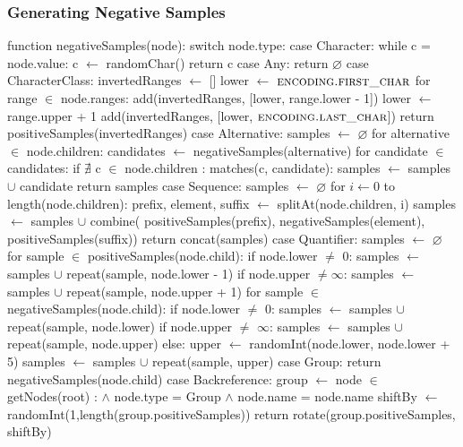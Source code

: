\subsubsection{Generating Negative Samples}

\begin{pseudoCode}[title={Generating Negative Test Samples},breakable=true,label=code:verificationNegative]
function negativeSamples(node):
  switch node.type:
    case Character: %
      while c = node.value:
        c $\gets$ randomChar()
      return c
    case Any:
      return $\varnothing$ %
    case CharacterClass: %
      invertedRanges $\gets$ []
      lower $\gets$ $\textsc{encoding.first\_char}$ 
      for range $\in$ node.ranges:
        add(invertedRanges, [lower, range.lower - 1])
        lower $\gets$ range.upper + 1
      add(invertedRanges, [lower, $\textsc{encoding.last\_char}$])
      return positiveSamples(invertedRanges) %
    case Alternative: %
      samples $\gets$ $\varnothing$
      for alternative $\in$ node.children:
        candidates $\gets$ negativeSamples(alternative)
        for candidate $\in$ candidates:
          if $\nexists$ c $\in$ node.children : matches(c, candidate):
            samples $\gets$ samples $\cup$ candidate
      return samples %
    case Sequence:
      samples $\gets$ $\varnothing$ 
      for $i \gets 0$ to length(node.children):
        prefix, element, suffix $\gets$ splitAt(node.children, i)
        samples $\gets$ samples $\cup$ combine(
                              positiveSamples(prefix), 
                              negativeSamples(element), 
                              positiveSamples(suffix))
      return concat(samples)
    case Quantifier:
      samples $\gets$ $\varnothing$ 
      for sample $\in$ positiveSamples(node.child): %
        if node.lower $\neq$ 0:
          samples $\gets$ samples $\cup$ repeat(sample, node.lower - 1) 
        if node.upper $\neq \infty$:
          samples $\gets$ samples $\cup$ repeat(sample, node.upper + 1) %
      for sample $\in$ negativeSamples(node.child): %
        if node.lower $\neq$ 0:
          samples $\gets$ samples $\cup$ repeat(sample, node.lower)
        if node.upper $\neq$ $\infty$:
          samples $\gets$ samples $\cup$ repeat(sample, node.upper)
        else:
          upper $\gets$ randomInt(node.lower, node.lower + 5)
          samples $\gets$ samples $\cup$ repeat(sample, upper) %
    case Group:
      return negativeSamples(node.child)
    case Backreference:  %
      group $\gets$ node $\in$ getNodes(root) :
                        $\land$ node.type = Group 
                        $\land$ node.name = node.name
      shiftBy $\gets$ randomInt(1,length(group.positiveSamples))
      return rotate(group.positiveSamples, shiftBy) %
\end{pseudoCode}

